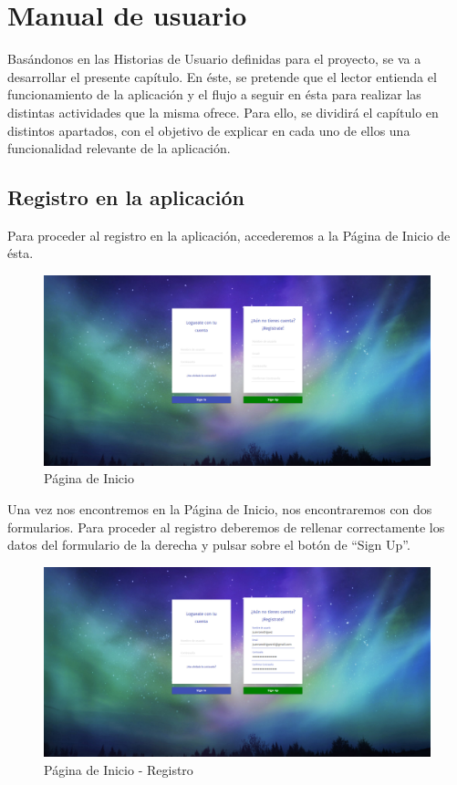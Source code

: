 \documentclass[11pt,openany]{book}
\begin{document}
\chapter{Manual de usuario}

Basándonos en las Historias de Usuario definidas para el proyecto, se va a desarrollar el presente capítulo. En éste, se pretende que el lector entienda el funcionamiento de la aplicación y el flujo a seguir en ésta para realizar las distintas actividades que la misma ofrece. Para ello, se dividirá el capítulo en distintos apartados, con el objetivo de explicar en cada uno de ellos una funcionalidad relevante de la aplicación.

\pagebreak
\section{Registro en la aplicación}

Para proceder al registro en la aplicación, accederemos a la Página de Inicio de ésta.

\begin{figure}[H]
\centering
\includegraphics[totalheight=6cm]{manualUsuario/paginaInicio.png}
\caption{Página de Inicio}
\end{figure}

Una vez nos encontremos en la Página de Inicio, nos encontraremos con dos formularios. Para proceder al registro deberemos de rellenar correctamente los datos del formulario de la derecha y pulsar sobre el botón de ``Sign Up''. 

\begin{figure}[H]
\centering
\includegraphics[totalheight=6cm]{manualUsuario/registro.png}
\caption{Página de Inicio - Registro}
\end{figure}
\end{document}
